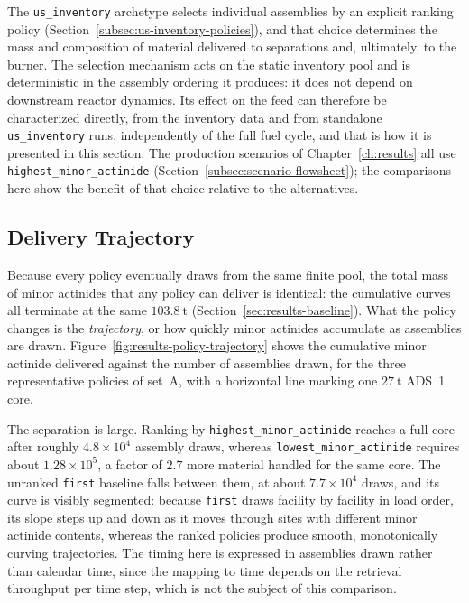 The \texttt{us\_inventory} archetype selects individual assemblies by an explicit
ranking policy (Section~\ref{subsec:us-inventory-policies}), and that choice
determines the mass and composition of material delivered to separations and,
ultimately, to the burner. The selection mechanism acts on the static inventory
pool and is deterministic in the assembly ordering it produces: it does not
depend on downstream reactor dynamics. Its effect on the feed can therefore be
characterized directly, from the inventory data and from standalone
\texttt{us\_inventory} runs, independently of the full fuel cycle, and that is
how it is presented in this section. The production scenarios of
Chapter~\ref{ch:results} all use \texttt{highest\_minor\_actinide}
(Section~\ref{subsec:scenario-flowsheet}); the comparisons here show the benefit
of that choice relative to the alternatives.

\subsection{Delivery Trajectory}
\label{subsec:results-policy-trajectory}

Because every policy eventually draws from the same finite pool, the total mass
of minor actinides that any policy can deliver is identical: the cumulative curves all
terminate at the same $103.8~\mathrm{t}$
(Section~\ref{sec:results-baseline}). What the policy changes is the
\emph{trajectory}, or how quickly minor actinides accumulate as assemblies are
drawn. Figure~\ref{fig:results-policy-trajectory} shows the cumulative minor
actinide delivered against the number of assemblies drawn, for the three
representative policies of set~A, with a horizontal line marking one
$27~\mathrm{t}$ ADS~1 core.

The separation is large. Ranking by \texttt{highest\_minor\_actinide} reaches a
full core after roughly $4.8\times10^{4}$ assembly draws, whereas
\texttt{lowest\_minor\_actinide} requires about $1.28\times10^{5}$, a factor of
$2.7$ more material handled for the same core. The unranked \texttt{first}
baseline falls between them, at about $7.7\times10^{4}$ draws, and its curve is
visibly segmented: because \texttt{first} draws facility by facility in load
order, its slope steps up and down as it moves through sites with different
minor actinide contents, whereas the ranked policies produce smooth,
monotonically curving trajectories. The timing here is expressed in assemblies
drawn rather than calendar time, since the mapping to time depends on the
retrieval throughput per time step, which is not the subject of this comparison.

